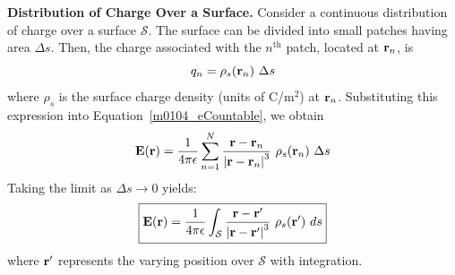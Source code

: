 
{\bf Distribution of Charge Over a Surface.}
Consider a continuous distribution of charge over a surface $\mathcal{S}$.
The surface can be divided into small patches having area $\Delta s$.  
Then, the charge associated with the $n^{\mbox{th}}$ patch, located at ${\bf r}_n$, is
%
\begin{equation}
q_n = \rho_s({\bf r}_n)~\Delta s
\end{equation}
%
where $\rho_s$ is the surface charge density (units of C/m$^2$) at ${\bf r}_n$.
Substituting this expression into Equation~\ref{m0104_eCountable}, we obtain
%
\begin{equation}
{\bf E}({\bf r}) = \frac{1}{4\pi\epsilon} \sum_{n=1}^{N} {   \frac{{\bf r}-{\bf r}_n}{\left|{\bf r}-{\bf r}_n\right|^3}~\rho_s({\bf r}_n)~\Delta s}
\end{equation}
%
Taking the limit as $\Delta s\to 0$ yields:
%
\begin{equation}
\boxed{
{\bf E}({\bf r}) = \frac{1}{4\pi\epsilon} \int_{\mathcal S} {   \frac{{\bf r}-{\bf r}'}{\left|{\bf r}-{\bf r}'\right|^3}~\rho_s({\bf r}')~ds}
}
\label{m0104_eSurfCharge}
\end{equation}
%
where ${\bf r}'$ represents the varying position over ${\mathcal S}$ with integration.


